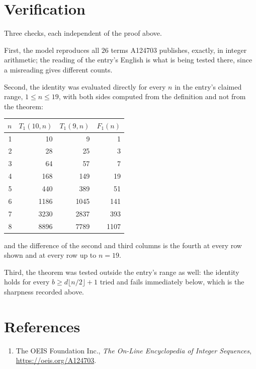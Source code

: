 \documentclass[11pt,a4paper]{article}
\theoremstyle{plain}
\theoremstyle{definition}
\begin{document}
\section{Verification}

Three checks, each independent of the proof above.

First, the model reproduces all $26$ terms A124703 publishes, exactly, in integer
arithmetic; the reading of the entry's English is what is being tested there, since a
misreading gives different counts.

Second, the identity was evaluated directly for every $n$ in the entry's claimed range,
$1\le n\le19$, with both sides computed from the definition and not from the theorem:

\begin{center}
\begin{tabular}{rrrr}
$n$ & $T_{1}(10,n)$ & $T_{1}(9,n)$ & $F_{1}(n)$ \\ \hline
1 & 10 & 9 & 1 \\
2 & 28 & 25 & 3 \\
3 & 64 & 57 & 7 \\
4 & 168 & 149 & 19 \\
5 & 440 & 389 & 51 \\
6 & 1186 & 1045 & 141 \\
7 & 3230 & 2837 & 393 \\
8 & 8896 & 7789 & 1107 \\
\end{tabular}
\end{center}

\noindent and the difference of the second and third columns is the fourth at every row shown
and at every row up to $n=19$.

Third, the theorem was tested outside the entry's range as well: the identity holds for every
$b\ge d\lfloor n/2\rfloor+1$ tried and fails immediately below, which is the sharpness recorded
above.

\section*{References}
\begin{enumerate}
\item The OEIS Foundation Inc., \emph{The On-Line Encyclopedia of Integer Sequences},
\url{https://oeis.org/A124703}.
\end{enumerate}
\end{document}
